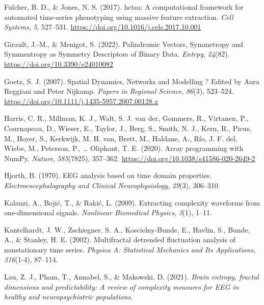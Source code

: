 \documentclass[
  man]{apa6}
\newlength{\cslhangindent}
\newlength{\cslentryspacingunit} %
\newenvironment{CSLReferences}[2] %
 {%
  \setlength{\parindent}{0pt}
  \ifodd #1
  \let\oldpar\par
  \def\par{\hangindent=\cslhangindent\oldpar}
  \fi
  \setlength{\parskip}{#2\cslentryspacingunit}
 }%
 {}
\begin{document}
\begin{CSLReferences}{1}{0}
\leavevmode{}%
Fulcher, B. D., \& Jones, N. S. (2017). hctsa: A computational framework for automated time-series phenotyping using massive feature extraction. \emph{Cell Systems}, \emph{5}, 527--531. \url{https://doi.org/10.1016/j.cels.2017.10.001}

\leavevmode{}%
Girault, J.-M., \& Menigot, S. (2022). Palindromic Vectors, Symmetropy and Symmentropy as Symmetry Descriptors of Binary Data. \emph{Entrpy}, \emph{24}(82). \url{https://doi.org/10.3390/e24010082}

\leavevmode{}%
Goetz, S. J. (2007). Spatial Dynamics, Networks and Modelling ? Edited by Aura Reggiani and Peter Nijkamp. \emph{Papers in Regional Science}, \emph{86}(3), 523--524. \url{https://doi.org/10.1111/j.1435-5957.2007.00128.x}

\leavevmode{}%
Harris, C. R., Millman, K. J., Walt, S. J. van der, Gommers, R., Virtanen, P., Cournapeau, D., Wieser, E., Taylor, J., Berg, S., Smith, N. J., Kern, R., Picus, M., Hoyer, S., Kerkwijk, M. H. van, Brett, M., Haldane, A., Río, J. F. del, Wiebe, M., Peterson, P., \ldots{} Oliphant, T. E. (2020). Array programming with {NumPy}. \emph{Nature}, \emph{585}(7825), 357--362. \url{https://doi.org/10.1038/s41586-020-2649-2}

\leavevmode{}%
Hjorth, B. (1970). EEG analysis based on time domain properties. \emph{Electroencephalography and Clinical Neurophysiology}, \emph{29}(3), 306--310.

\leavevmode{}%
Kalauzi, A., Bojić, T., \& Rakić, L. (2009). Extracting complexity waveforms from one-dimensional signals. \emph{Nonlinear Biomedical Physics}, \emph{3}(1), 1--11.

\leavevmode{}%
Kantelhardt, J. W., Zschiegner, S. A., Koscielny-Bunde, E., Havlin, S., Bunde, A., \& Stanley, H. E. (2002). Multifractal detrended fluctuation analysis of nonstationary time series. \emph{Physica A: Statistical Mechanics and Its Applications}, \emph{316}(1-4), 87--114.

\leavevmode{}%
Lau, Z. J., Pham, T., Annabel, S., \& Makowski, D. (2021). \emph{Brain entropy, fractal dimensions and predictability: A review of complexity measures for EEG in healthy and neuropsychiatric populations}.


\end{CSLReferences}
\end{document}

